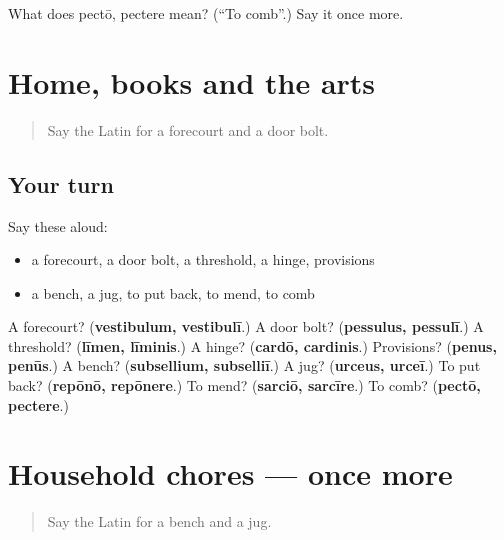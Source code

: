 \begin{tcolorbox}[breakable,colback=teal!4,colframe=teal!35!black,title={Before you move on}]
What does pectō, pectere mean? (\textquotedblleft{}To comb\textquotedblright{}.) Say it once more.
\end{tcolorbox}
\section[(dialogue)]{Home, books and the arts}

\label{lesson:LA-R554-review-553-554}



\begin{quote}
Say the Latin for a forecourt and a door bolt.
\end{quote}

\subsection*{Your turn}
Say these aloud:

\begin{itemize}
\raggedright
  \item a forecourt, a door bolt, a threshold, a hinge, provisions
  \item a bench, a jug, to put back, to mend, to comb
\end{itemize}

\begin{tcolorbox}[breakable,colback=teal!4,colframe=teal!35!black,title={Before you move on}]
A forecourt? (\textbf{vestibulum, vestibulī}.) A door bolt? (\textbf{pessulus, pessulī}.) A threshold? (\textbf{līmen, līminis}.) A hinge? (\textbf{cardō, cardinis}.) Provisions? (\textbf{penus, penūs}.) A bench? (\textbf{subsellium, subselliī}.) A jug? (\textbf{urceus, urceī}.) To put back? (\textbf{repōnō, repōnere}.) To mend? (\textbf{sarciō, sarcīre}.) To comb? (\textbf{pectō, pectere}.)
\end{tcolorbox}
\section[(dialogue)]{Household chores — once more}

\label{lesson:LA-R554-review-final-554}



\begin{quote}
Say the Latin for a bench and a jug.
\end{quote}

